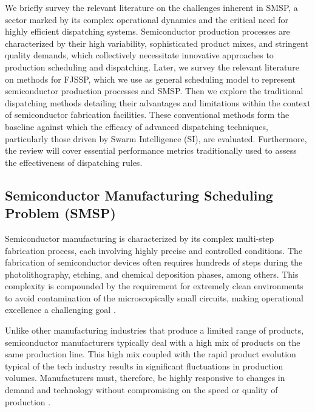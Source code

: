 We briefly survey the relevant literature on the challenges inherent in SMSP, a sector marked by its complex operational dynamics and the critical need for highly efficient dispatching systems. Semiconductor production processes are characterized by their high variability, sophisticated product mixes, and stringent quality demands, which collectively necessitate innovative approaches to production scheduling and dispatching. 
Later, we survey the relevant literature on methods for FJSSP, which we use as general
scheduling model to represent semiconductor production processes and SMSP.
Then we explore the traditional dispatching methods detailing their advantages and limitations within the context of semiconductor fabrication facilities. These conventional methods form the baseline against which the efficacy of advanced dispatching techniques, particularly those driven by Swarm Intelligence (SI), are evaluated. Furthermore, the review will cover essential performance metrics traditionally used to assess the effectiveness of dispatching rules.
\subsection{Semiconductor Manufacturing Scheduling Problem (SMSP)}
Semiconductor manufacturing is characterized by its complex multi-step fabrication process, each involving highly precise and controlled conditions. The fabrication of semiconductor devices often requires hundreds of steps during the photolithography, etching, and chemical deposition phases, among others. This complexity is compounded by the requirement for extremely clean environments to avoid contamination of the microscopically small circuits, making operational excellence a challenging goal \cite{May2006}.

Unlike other manufacturing industries that produce a limited range of products, semiconductor manufacturers typically deal with a high mix of products on the same production line. This high mix coupled with the rapid product evolution typical of the tech industry results in significant fluctuations in production volumes. Manufacturers must, therefore, be highly responsive to changes in demand and technology without compromising on the speed or quality of production .

